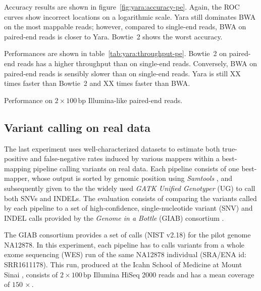Accuracy results are shown in figure~\ref{fig:yara:accuracy-pe}.
Again, the ROC curves show incorrect locations on a logarithmic scale.
Yara still dominates BWA on the most mappable reads; however, compared to single-end reads, BWA on paired-end reads is closer to Yara.
Bowtie~2 shows the worst accuracy. 

Performances are shown in table~\ref{tab:yara:throughput-pe}.
Bowtie~2 on paired-end reads has a higher throughput than on single-end reads.
Conversely, BWA on paired-end reads is sensibly slower than on single-end reads.
Yara is still XX times faster than Bowtie~2 and XX times faster than BWA.

\begin{table}[b]
\begin{center}
\caption[Yara performance on Illumina-like paired-end reads]{Performance on $2 \times 100\,\text{bp}$ Illumina-like paired-end reads.}
\sffamily

\label{tab:yara:throughput-pe}
\end{center}
\end{table}



\subsection{Variant calling on real data}
\label{sec:yara:eval:calling}


The last experiment uses well-characterized datasets to estimate both true-positive and false-negative rates induced by various mappers within a best-mapping pipeline calling variants on real data.
Each pipeline consists of one best-mapper, whose output is sorted by genomic position using \emph{Samtools} \citep{Li2009}, and subsequently given to the the widely used \emph{GATK Unified Genotyper} (UG) \citep{DePristo2011} to call both SNVs and INDELs.
The evaluation consists of comparing the variants called by each pipeline to a set of high-confidence, single-nucleotide variant (SNV) and INDEL calls provided by the \emph{Genome in a Bottle} (GIAB) consortium \citep{Zook2014}.

The GIAB consortium provides a set of calls (NIST v2.18) for the pilot genome NA12878.
In this experiment, each pipeline has to calls variants from a whole exome sequencing (WES) run of the same NA12878 individual (SRA/ENA id: SRR1611178).
This run, produced at the Icahn School of Medicine at Mount Sinai \citep{Linderman2014}, consists of $2 \times 100\,\text{bp}$ Illumina HiSeq 2000 reads and has a mean coverage of $150\, \times$.

